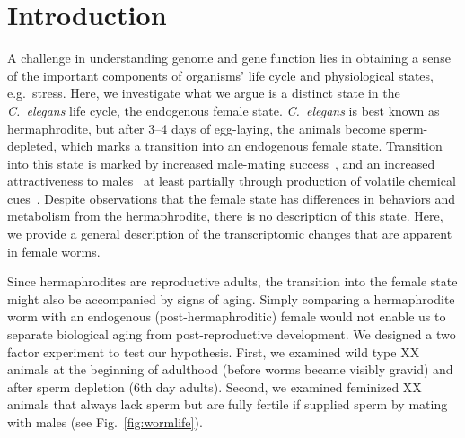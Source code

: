 \documentclass[10pt,letterpaper,twocolumn]{article}
\newcommand{\cel}{\emph{C.~elegans}}
\begin{document}
\section*{Introduction}
\label{sec:introduction}

A challenge in understanding genome and gene function lies in obtaining a sense of the important components of organisms' life cycle and physiological states, e.g.\ stress. Here, we investigate what we argue is a distinct state in the \cel{} life cycle, the endogenous female state. \cel{} is best known as hermaphrodite, but after 3--4 days of egg-laying, the animals become sperm-depleted, which marks a transition into an endogenous female state. Transition into this state is marked by increased male-mating success~\cite{Garcia2001}, and an increased attractiveness to males~\cite{Morsci2011} at least partially through production of volatile chemical cues~\cite{Leighton2014}. Despite observations that the female state has differences in  behaviors and metabolism from the hermaphrodite, there is no description of this state. Here, we provide a general description of the transcriptomic changes that are apparent in female worms.



Since hermaphrodites are reproductive adults, the transition into the female state might also be accompanied by signs of aging. Simply comparing a hermaphrodite worm with an endogenous (post-hermaphroditic) female would not enable us to separate biological aging from post-reproductive development. We designed a two factor experiment to test our hypothesis. First, we examined wild type XX animals at the beginning of adulthood (before worms became visibly gravid) and after sperm depletion (6th day adults). Second, we examined feminized XX animals that always lack sperm but are fully fertile if supplied sperm by mating with males (see Fig.~\ref{fig:wormlife}).
\end{document}
